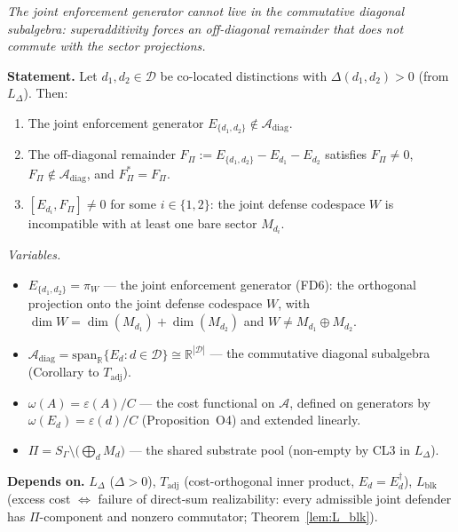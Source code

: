 \documentclass[11pt]{article}
\theoremstyle{remark}
\newenvironment{varlist}{\begin{itemize}[nosep,leftmargin=2em]}{\end{itemize}}
\begin{document}
\begin{tcolorbox}[apfbox, title={Corollary of $L_\Pi$ (Joint Enforcement is Not Diagonal)}]
\label{cor:L_Pi_nondiag}
\textit{The joint enforcement generator cannot live in the commutative diagonal subalgebra: superadditivity forces an off-diagonal remainder that does not commute with the sector projections.}

\smallskip\noindent\textbf{Statement.}  Let $d_1, d_2 \in \mathcal{D}$ be co-located distinctions with $\Delta(d_1,d_2) > 0$ (from $L_\Delta$).  Then:
\begin{enumerate}[nosep,leftmargin=2em,itemsep=3pt,label=(\arabic*)]
  \item The joint enforcement generator $E_{\{d_1,d_2\}} \notin \mathcal{A}_{\mathrm{diag}}$.
  \item The off-diagonal remainder $F_\Pi := E_{\{d_1,d_2\}} - E_{d_1} - E_{d_2}$ satisfies $F_\Pi \ne 0$, $F_\Pi \notin \mathcal{A}_{\mathrm{diag}}$, and $F_\Pi^* = F_\Pi$.
  \item $[E_{d_i}, F_\Pi] \ne 0$ for some $i \in \{1,2\}$: the joint defense codespace $W$ is incompatible with at least one bare sector $M_{d_i}$.
\end{enumerate}

\smallskip\noindent\textit{Variables.}
\begin{varlist}
\item $E_{\{d_1,d_2\}} = \pi_W$ --- the joint enforcement generator (FD6): the orthogonal projection onto the joint defense codespace $W$, with $\dim W = \dim(M_{d_1})+\dim(M_{d_2})$ and $W \ne M_{d_1} \oplus M_{d_2}$.
\item $\mathcal{A}_{\mathrm{diag}} = \mathrm{span}_\mathbb{R}\{E_d : d \in \mathcal{D}\} \cong \mathbb{R}^{|\mathcal{D}|}$ --- the commutative diagonal subalgebra (Corollary to $T_{\mathrm{adj}}$).
\item $\omega(A) = \varepsilon(A)/C$ --- the cost functional on $\mathcal{A}$, defined on generators by $\omega(E_d) = \varepsilon(d)/C$ (Proposition~O4) and extended linearly.
\item $\Pi = S_\Gamma \setminus \bigl(\bigoplus_d M_d\bigr)$ --- the shared substrate pool (non-empty by CL3 in $L_\Delta$).
\end{varlist}

\smallskip\noindent\textbf{Depends on.}  $L_\Delta$ ($\Delta > 0$), $T_{\mathrm{adj}}$ (cost-orthogonal inner product, $E_d = E_d^\dagger$), $L_{\mathrm{blk}}$ (excess cost $\Leftrightarrow$ failure of direct-sum realizability: every admissible joint defender has $\Pi$-component and nonzero commutator; Theorem~\ref{lem:L_blk}).


\end{tcolorbox}
\end{document}
